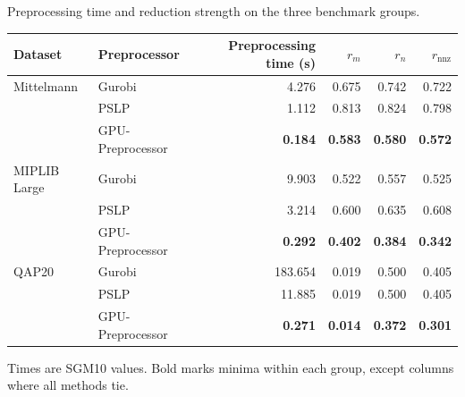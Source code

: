 \begin{table}[htbp]
\TABLE
{Preprocessing time and reduction strength on the
three benchmark groups.\label{tab:preprocessing-performance}}
{\begin{tabular}{@{}llrrrr@{}}
\toprule
Dataset & Preprocessor & Preprocessing time (s)
& \(r_m\) & \(r_n\) & \(r_{\mathrm{nnz}}\) \\
\midrule
Mittelmann & Gurobi
& 4.276 & 0.675 & 0.742 & 0.722 \\
& PSLP
& 1.112 & 0.813 & 0.824 & 0.798 \\
& GPU-Preprocessor
& \textbf{0.184} & \textbf{0.583}
& \textbf{0.580} & \textbf{0.572} \\
\midrule
MIPLIB Large & Gurobi
& 9.903 & 0.522 & 0.557 & 0.525 \\
& PSLP
& 3.214 & 0.600 & 0.635 & 0.608 \\
& GPU-Preprocessor
& \textbf{0.292} & \textbf{0.402}
& \textbf{0.384} & \textbf{0.342} \\
\midrule
QAP20 & Gurobi
& 183.654 & 0.019 & 0.500 & 0.405 \\
& PSLP
& 11.885 & 0.019 & 0.500 & 0.405 \\
& GPU-Preprocessor
& \textbf{0.271} & \textbf{0.014}
& \textbf{0.372} & \textbf{0.301} \\
\bottomrule
\end{tabular}}
{Times are SGM10 values. Bold marks minima within each group,
except columns where all methods tie.}
\end{table}
